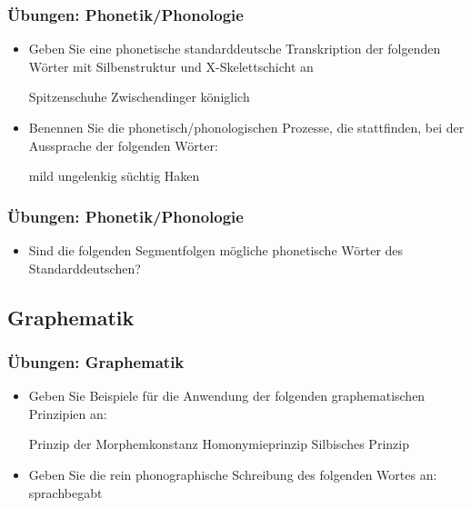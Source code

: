 \begin{frame}
\frametitle{Übungen: Phonetik/Phonologie}

\begin{itemize}
	\item Geben Sie eine phonetische standarddeutsche Transkription der folgenden Wörter mit Silbenstruktur und X-Skelettschicht an
	
	\eal
	\ex Spitzenschuhe
	\ex Zwischendinger
	\ex königlich	
	\zl

	\item Benennen Sie die phonetisch/phonologischen Prozesse, die stattfinden, bei der Aussprache der folgenden Wörter:
	
	\eal
	\ex mild
	\ex ungelenkig
	\ex süchtig
	\ex Haken
	\zl


\end{itemize}

\end{frame}


\begin{frame}
\frametitle{Übungen: Phonetik/Phonologie}

\begin{itemize}
	\item Sind die folgenden Segmentfolgen mögliche phonetische Wörter des Standarddeutschen?
	\ea {}	
	\ex \textipa{[Ne:."nt@g]}
	\z 
	
\end{itemize}

\end{frame}


\subsection{Graphematik}

\begin{frame}
\frametitle{Übungen: Graphematik}

\begin{itemize}
	\item Geben Sie Beispiele für die Anwendung der folgenden graphematischen Prinzipien an:
	
	\eal 
	\ex Prinzip der Morphemkonstanz
	\ex Homonymieprinzip
	\ex Silbisches Prinzip
	\zl
	
	\item Geben Sie die rein phonographische Schreibung des folgenden Wortes an:
	\ea sprachbegabt
	\z
	
	
\end{itemize}

\end{frame}

